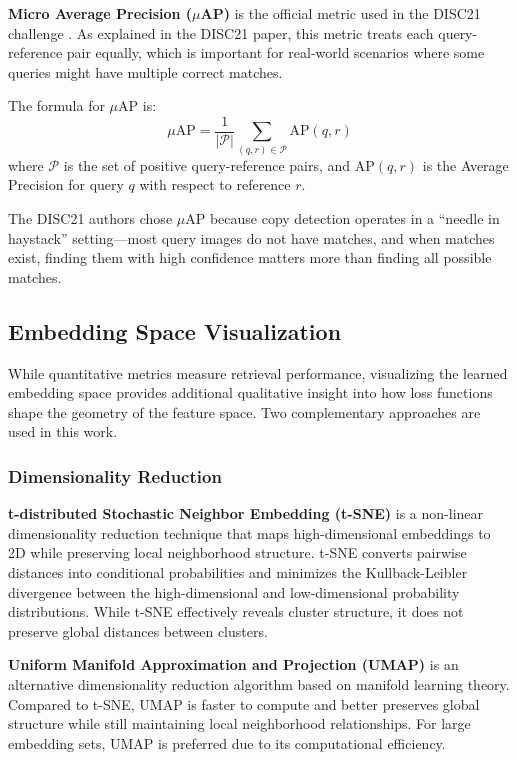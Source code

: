 \documentclass[
    english,
]{VUMIFPSbakalaurinis}
\begin{document}
\textbf{Micro Average Precision ($\mu$AP)} is the official metric used in the DISC21 challenge \cite{Dou21}. As explained in the DISC21 paper, this metric treats each query-reference pair equally, which is important for real-world scenarios where some queries might have multiple correct matches.

The formula for $\mu$AP \cite{Dou21} is:
\begin{equation}
\mu\text{AP} = \frac{1}{|\mathcal{P}|} \sum_{(q,r) \in \mathcal{P}} \text{AP}(q,r)
\label{eq:muap}
\end{equation}
where $\mathcal{P}$ is the set of positive query-reference pairs, and $\text{AP}(q,r)$ is the Average Precision for query $q$ with respect to reference $r$.

The DISC21 authors chose $\mu$AP because copy detection operates in a \enquote{needle in haystack} setting---most query images do not have matches, and when matches exist, finding them with high confidence matters more than finding all possible matches.

\subsection{Embedding Space Visualization}

While quantitative metrics measure retrieval performance, visualizing the learned embedding space provides additional qualitative insight into how loss functions shape the geometry of the feature space. Two complementary approaches are used in this work.

\subsubsection{Dimensionality Reduction}

\textbf{t-distributed Stochastic Neighbor Embedding (t-SNE)} \cite{van08} is a non-linear dimensionality reduction technique that maps high-dimensional embeddings to 2D while preserving local neighborhood structure. t-SNE converts pairwise distances into conditional probabilities and minimizes the Kullback-Leibler divergence between the high-dimensional and low-dimensional probability distributions. While t-SNE effectively reveals cluster structure, it does not preserve global distances between clusters.

\textbf{Uniform Manifold Approximation and Projection (UMAP)} \cite{McI18} is an alternative dimensionality reduction algorithm based on manifold learning theory. Compared to t-SNE, UMAP is faster to compute and better preserves global structure while still maintaining local neighborhood relationships. For large embedding sets, UMAP is preferred due to its computational efficiency.
\end{document}
